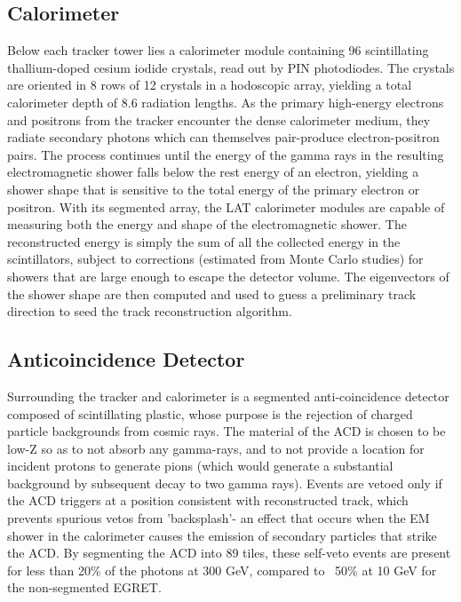 \subsection{Calorimeter}
Below each tracker tower lies a calorimeter module containing 96 scintillating thallium-doped cesium iodide crystals, read out by PIN photodiodes. The crystals are oriented in 8 rows of 12 crystals in a hodoscopic array, yielding a total calorimeter depth of 8.6 radiation lengths. As the primary high-energy electrons and positrons from the tracker encounter the dense calorimeter medium, they radiate secondary photons which can themselves pair-produce electron-positron pairs. The process continues until the energy of the gamma rays in the resulting electromagnetic shower falls below the rest energy of an electron, yielding a shower shape that is sensitive to the total energy of the primary electron or positron. 
With its segmented array, the LAT calorimeter modules are capable of measuring both the energy and shape of the electromagnetic shower. The reconstructed energy is simply the sum of all the collected energy in the scintillators, subject to corrections (estimated from Monte Carlo studies) for showers that are large enough to escape the detector volume. The eigenvectors of the shower shape are then computed and used to guess a preliminary track direction to seed the track reconstruction algorithm.

\subsection{Anticoincidence Detector}
Surrounding the tracker and calorimeter is a segmented anti-coincidence detector composed of scintillating plastic, whose purpose is the rejection of charged particle backgrounds from cosmic rays. The material of the ACD is chosen to be low-Z so as to not absorb any gamma-rays, and to not provide a location for incident protons to generate pions (which would generate a substantial background by subsequent decay to two gamma rays). 
Events are vetoed only if the ACD triggers at a position consistent with reconstructed track, which prevents spurious vetos from 'backsplash'- an effect that occurs when the EM shower in the calorimeter causes the emission of secondary particles that strike the ACD. By segmenting the ACD into 89 tiles, these self-veto events are present for less than 20\% of the photons at 300 GeV, compared to ~50\% at 10 GeV for the non-segmented EGRET.

